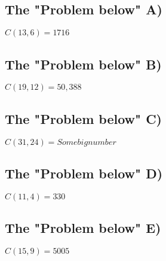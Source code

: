 \documentclass[12]{scrartcl}
\begin{document}
\subsection*{The "Problem below" A)}
$C(13,6) =1716$
\subsection*{The "Problem below" B)}
$C(19,12) =50,388$
\subsection*{The "Problem below" C)}
$C(31,24) = Some big number$
\subsection*{The "Problem below" D)}
$C(11,4) = 330$
\subsection*{The "Problem below" E)}
$C(15,9) = 5005$
\end{document}
